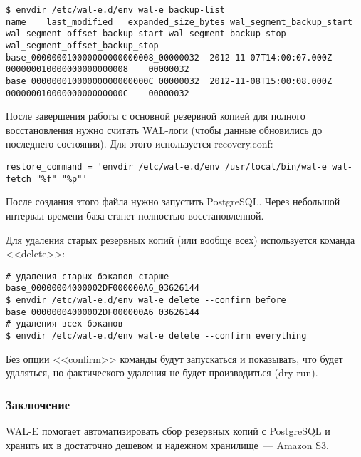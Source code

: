 \begin{lstlisting}[label=lst:wal-e12,caption=Список резервных копий]
$ envdir /etc/wal-e.d/env wal-e backup-list
name	last_modified	expanded_size_bytes	wal_segment_backup_start	wal_segment_offset_backup_start	wal_segment_backup_stop	wal_segment_offset_backup_stop
base_000000010000000000000008_00000032	2012-11-07T14:00:07.000Z		000000010000000000000008	00000032
base_00000001000000000000000C_00000032	2012-11-08T15:00:08.000Z		00000001000000000000000C	00000032
\end{lstlisting}

После завершения работы с основной резервной копией для полного восстановления нужно считать WAL-логи (чтобы данные обновились до последнего состояния). Для этого используется recovery.conf:

\begin{lstlisting}[label=lst:wal-e13,caption=recovery.conf]
restore_command = 'envdir /etc/wal-e.d/env /usr/local/bin/wal-e wal-fetch "%f" "%p"'
\end{lstlisting}

После создания этого файла нужно запустить PostgreSQL. Через небольшой интервал времени база станет полностью восстановленной.

Для удаления старых резервных копий (или вообще всех) используется команда <<delete>>:

\begin{lstlisting}[label=lst:wal-e14,caption=Удаление резервных копий]
# удаления старых бэкапов старше base_00000004000002DF000000A6_03626144
$ envdir /etc/wal-e.d/env wal-e delete --confirm before base_00000004000002DF000000A6_03626144
# удаления всех бэкапов
$ envdir /etc/wal-e.d/env wal-e delete --confirm everything
\end{lstlisting}

Без опции <<confirm>> команды будут запускаться и показывать, что будет удаляться, но фактического удаления не будет производиться (dry run).

\subsubsection{Заключение}
WAL-E помогает автоматизировать сбор резервных копий с PostgreSQL и хранить их в достаточно дешевом и надежном хранилище~--- Amazon S3.